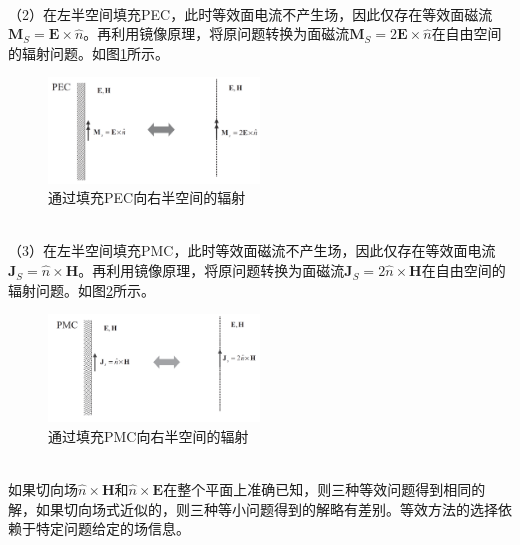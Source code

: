 \documentclass{article}
\numberwithin{equation}{section}
\begin{document}
\\
（2）在左半空间填充PEC，此时等效面电流不产生场，因此仅存在等效面磁流$\mathbf{M}_S=\mathbf{E}\times\hat{n}$。再利用镜像原理，将原问题转换为面磁流$\mathbf{M}_S=2\mathbf{E}\times\hat{n}$在自由空间的辐射问题。如图\ref{fig:fig30}所示。
\begin{figure}[ht]
    \centering
    \includegraphics[width=0.5\textwidth]{通过填充PEC向右半空间的辐射.PNG}
    \caption{通过填充PEC向右半空间的辐射}
    \label{fig:fig30}
\end{figure}
\\
（3）在左半空间填充PMC，此时等效面磁流不产生场，因此仅存在等效面电流$\mathbf{J}_S=\hat{n}\times\mathbf{H}$。再利用镜像原理，将原问题转换为面磁流$\mathbf{J}_S=2\hat{n}\times\mathbf{H}$在自由空间的辐射问题。如图\ref{fig:fig31}所示。
\begin{figure}[ht]
    \centering
    \includegraphics[width=0.5\textwidth]{通过填充PMC向右半空间的辐射.PNG}
    \caption{通过填充PMC向右半空间的辐射}
    \label{fig:fig31}
\end{figure}
\\如果切向场$\hat{n}\times\mathbf{H}$和$\hat{n}\times\mathbf{E}$在整个平面上准确已知，则三种等效问题得到相同的解，如果切向场式近似的，则三种等小问题得到的解略有差别。等效方法的选择依赖于特定问题给定的场信息。
\end{document}
